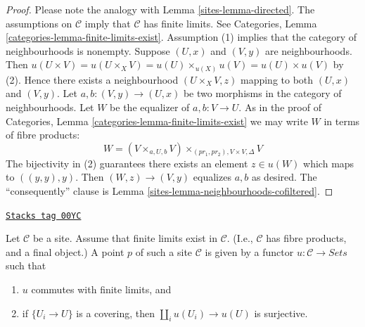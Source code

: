 \begin{proof}

Please note the analogy with Lemma \ref{sites-lemma-directed}.
The assumptions on $\mathcal{C}$ imply that $\mathcal{C}$ has finite limits.
See Categories, Lemma \ref{categories-lemma-finite-limits-exist}.
Assumption (1) implies that the category of neighbourhoods
is nonempty. Suppose $(U, x)$ and $(V, y)$ are neighbourhoods.
Then
$u(U \times V) = u(U \times_X V) =
u(U) \times_{u(X)} u(V) = u(U) \times u(V)$ by (2).
Hence there exists a neighbourhood $(U \times_X V, z)$ mapping
to both $(U, x)$ and $(V, y)$.
Let $a, b : (V, y) \to (U, x)$ be two morphisms
in the category of neighbourhoods. Let $W$ be the equalizer of
$a, b : V \to U$. As in the proof of
Categories, Lemma \ref{categories-lemma-finite-limits-exist}
we may write $W$ in terms of fibre products:
$$
W = (V \times_{a, U, b} V) \times_{(pr_1, pr_2), V \times V, \Delta} V
$$
The bijectivity in (2) guarantees there exists an element $z \in u(W)$
which maps to $((y, y), y)$.
Then $(W, z) \to (V, y)$ equalizes $a, b$ as desired.
The ``consequently'' clause is Lemma \ref{sites-lemma-neighbourhoods-cofiltered}.
\end{proof}

\begin{proposition}
\label{sites-proposition-point-limits}
\href{https://stacks.math.columbia.edu/tag/00YC}{\texttt{Stacks tag 00YC}}

Let $\mathcal{C}$ be a site. Assume that finite limits exist
in $\mathcal{C}$. (I.e., $\mathcal{C}$ has fibre products, and a
final object.) A point $p$ of such a site $\mathcal{C}$
is given by a functor $u : \mathcal{C} \to \textit{Sets}$ such that
\begin{enumerate}
\item $u$ commutes with finite limits, and
\item if $\{U_i \to U\}$ is a covering, then
$\coprod_i u(U_i) \to u(U)$ is surjective.
\end{enumerate}
\end{proposition}


